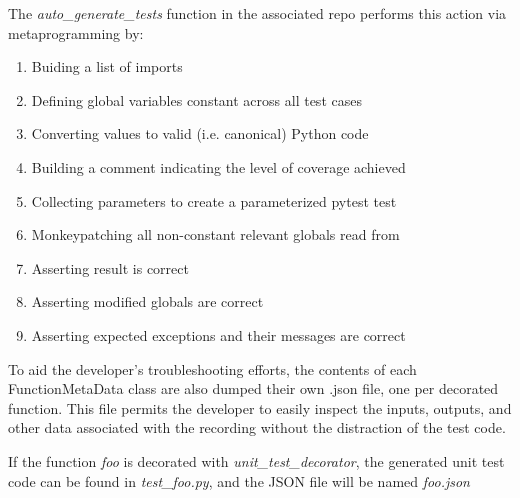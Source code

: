 The \textit{auto\_generate\_tests} function in the associated repo performs this 
action via metaprogramming by:
\begin{enumerate}
  \item Buiding a list of imports
  \item Defining global variables constant across all test cases
  \item Converting values to valid (i.e. canonical) Python code
  \item Building a comment indicating the level of coverage achieved
  \item Collecting parameters to create a parameterized pytest test
  \item Monkeypatching all non-constant relevant globals read from
  \item Asserting result is correct
  \item Asserting modified globals are correct
  \item Asserting expected exceptions and their messages are correct
\end{enumerate}

To aid the developer's troubleshooting efforts, the contents of each FunctionMetaData
class are also dumped their own .json file, one per decorated function.  This 
file permits the developer to easily inspect the inputs, outputs, and other data
associated with the recording without the distraction of the test code.

If the function \textit{foo} is decorated with \textit{unit\_test\_decorator},
the generated unit test code can be found in \textit{test\_foo.py}, and the 
JSON file will be named \textit{foo.json}


